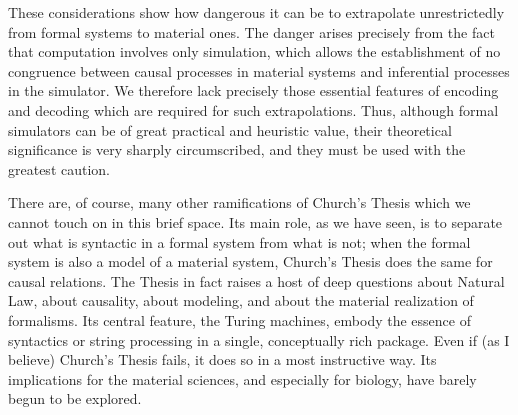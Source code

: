 \documentclass[a4paper,12pt]{article}
\begin{document}
These considerations show how dangerous it can be to extrapolate unrestrictedly from formal systems to material ones.
The danger arises precisely from the fact that computation involves only simulation, which allows the establishment of
no congruence between causal processes in material systems and inferential processes in the simulator. We therefore lack precisely
those essential features of encoding and decoding which are required for such extrapolations. Thus, although formal simulators can be of
great practical and heuristic value, their theoretical significance is very sharply circumscribed, and they must be used with the greatest caution.

There are, of course, many other ramifications of Church's Thesis which we cannot touch on in this brief space. Its main role, as we have seen,
is to separate out what is syntactic in a formal system from what is not; when the formal system is also a model of a material system,
Church's Thesis does the same for causal relations. The Thesis in fact raises a host of deep questions about Natural Law, about causality,
about modeling, and about the material realization of formalisms. Its central feature, the Turing machines, embody the essence of syntactics
or string processing in a single, conceptually rich package. Even if (as I believe) Church's Thesis fails, it does so in a most instructive way.
Its implications for the material sciences, and especially for biology, have barely begun to be explored.
\end{document}

